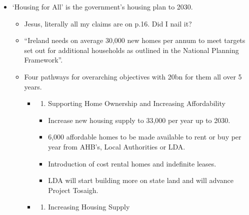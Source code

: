 \documentclass[11pt]{article}
\begin{document}
\begin{itemize}
\tightlist
\item
  `Housing for All' is the government's housing plan to 2030.

  \begin{itemize}
  \tightlist
  \item
    Jesus, literally all my claims are on p.16. Did I nail it?
  \item
    ``Ireland needs on average 30,000 new homes per annum to meet
    targets set out for additional households as outlined in the
    National Planning Framework''.
  \item
    Four pathways for overarching objectives with 20bn for them all over
    5 years.

    \begin{itemize}
    \item
      \begin{enumerate}
      \def\labelenumi{\arabic{enumi})}
      \tightlist
      \item
        Supporting Home Ownership and Increasing Affordability
      \end{enumerate}

      \begin{itemize}
      \tightlist
      \item
        Increase new housing supply to 33,000 per year up to 2030.
      \item
        6,000 affordable homes to be made available to rent or buy per
        year from AHB's, Local Authorities or LDA.
      \item
        Introduction of cost rental homes and indefinite leases.
      \item
        LDA will start building more on state land and will advance
        Project Tosaigh.
      \end{itemize}
    \item
      \begin{enumerate}
      \def\labelenumi{\arabic{enumi})}
      \setcounter{enumi}{2}
      \tightlist
      \item
        Increasing Housing Supply
      \end{enumerate}


\end{itemize}
\end{itemize}
\end{itemize}
\end{document}
